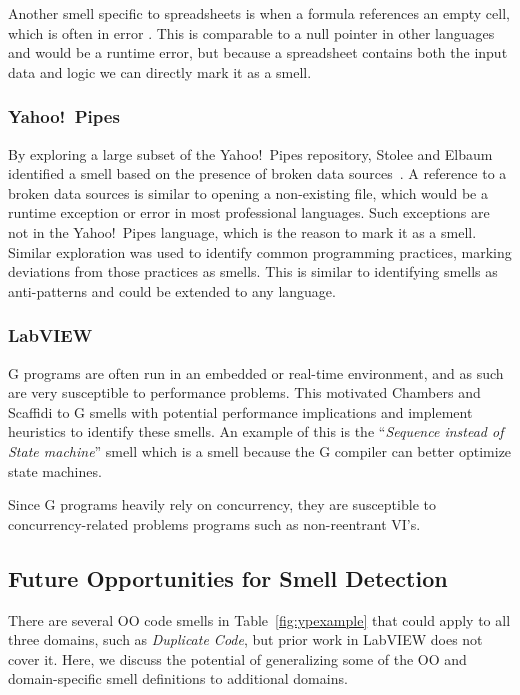 \documentclass{sig-alternate}
\begin{document}
Another smell specific to spreadsheets is when a formula references an empty cell, which is often in error \cite{cunha2012towards}.
This is comparable to a null pointer in other languages and would be a runtime error, but because a spreadsheet contains both the input data and logic we can directly mark it as a smell.

\subsubsection{Yahoo!\ Pipes}
By exploring a large subset of the Yahoo!\ Pipes repository, Stolee and Elbaum identified a smell based on the presence of broken data sources~\cite{StoleeTSE2013}.
A reference to a broken data sources  is similar to opening a non-existing file, which would be a runtime exception or error in most professional languages.
Such exceptions are not in the Yahoo!\ Pipes language, which is the reason to mark it as a smell. 
Similar exploration was used to  identify common programming practices, marking deviations from those practices as smells. 
This is similar to identifying  smells  as anti-patterns  and could be extended to any language. 


\subsubsection{LabVIEW}

G programs are often run in an embedded or real-time environment, and as such are very susceptible to performance problems. This motivated Chambers and Scaffidi \cite{chambers2013smell} to G smells with potential performance implications and implement heuristics to identify these smells.
An example of this is the ``\textit{Sequence instead of State machine}'' smell which is a smell because the G compiler can better optimize state machines.

Since G programs heavily rely on concurrency, they are susceptible to  concurrency-related problems programs such as non-reentrant VI's.


\subsection{Future Opportunities for Smell Detection}
\label{subsec:futuresmells}
There are several OO code smells in Table~\ref{fig:ypexample} that could apply to all three domains, such as \emph{Duplicate Code}, but prior work in LabVIEW does not cover it. Here, we discuss the potential of generalizing some of the OO and domain-specific smell definitions to additional domains. 
\end{document}
